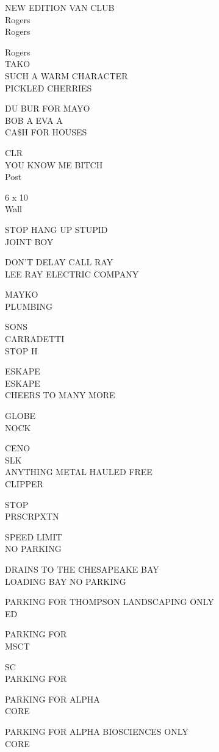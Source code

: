 \documentclass[10pt,letterpaper]{article}
\begin{document}
NEW EDITION VAN CLUB\\
Rogers\\
Rogers

Rogers\\
TAKO\\
SUCH A WARM CHARACTER\\
PICKLED CHERRIES

DU BUR FOR MAYO\\
BOB A EVA A\\
CA\$H FOR HOUSES

CLR\\
YOU KNOW ME BITCH\\
Post

6 x 10\\
Wall

STOP HANG UP STUPID\\
JOINT BOY

DON'T DELAY CALL RAY\\
LEE RAY ELECTRIC COMPANY

MAYKO\\
PLUMBING

SONS\\
CARRADETTI\\
STOP H

ESKAPE\\
ESKAPE\\
CHEERS TO MANY MORE

GLOBE\\
NOCK

CENO\\
SLK\\
ANYTHING METAL HAULED FREE\\
CLIPPER

STOP\\
PRSCRPXTN

SPEED LIMIT\\
NO PARKING

DRAINS TO THE CHESAPEAKE BAY\\
LOADING BAY NO PARKING

PARKING FOR THOMPSON LANDSCAPING ONLY\\
ED

PARKING FOR\\
MSCT

SC\\
PARKING FOR

PARKING FOR ALPHA\\
CORE

PARKING FOR ALPHA BIOSCIENCES ONLY\\
CORE
\end{document}
